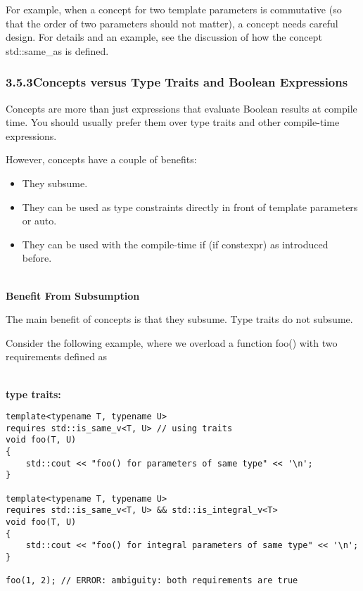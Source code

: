 For example, when a concept for two template parameters is commutative (so that the order of two parameters should not matter), a concept needs careful design. For details and an example, see the discussion of how the concept std::same\_as is defined.

\subsubsection*{ 3.5.3\hspace{0.2cm}Concepts versus Type Traits and Boolean Expressions}

Concepts are more than just expressions that evaluate Boolean results at compile time. You should usually prefer them over type traits and other compile-time expressions.

However, concepts have a couple of benefits:

\begin{itemize}
\item
They subsume.

\item
They can be used as type constraints directly in front of template parameters or auto.

\item
They can be used with the compile-time if (if constexpr) as introduced before.
\end{itemize}

\noindent
\hspace*{\fill} \\ %
\textbf{Benefit From Subsumption}


The main benefit of concepts is that they subsume. Type traits do not subsume.

Consider the following example, where we overload a function foo() with two requirements defined as


\noindent
\hspace*{\fill} \\ %
\textbf{type traits:}

\begin{lstlisting}[style=styleCXX]
template<typename T, typename U>
requires std::is_same_v<T, U> // using traits
void foo(T, U)
{
	std::cout << "foo() for parameters of same type" << '\n';
}

template<typename T, typename U>
requires std::is_same_v<T, U> && std::is_integral_v<T>
void foo(T, U)
{
	std::cout << "foo() for integral parameters of same type" << '\n';
}

foo(1, 2); // ERROR: ambiguity: both requirements are true
\end{lstlisting}

